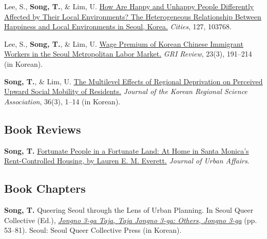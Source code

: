 \documentclass[11pt,letterpaper]{article}
\begin{document}
\begin{tablist}
  \item[2022] \tab{}Lee, S., \textbf{Song, T.}, \& Lim, U. \href{https://doi.org/10.1016/j.cities.2022.103768}{How Are Happy and Unhappy People Differently Affected by Their Local Environments? The Heterogeneous Relationship Between Happiness and Local Environments in Seoul, Korea.} \emph{Cities}, 127, 103768.
  \item[2021] \tab{}Lee, S., \textbf{Song, T.}, \& Lim, U. \href{https://www.dbpia.co.kr/Journal/articleDetail?nodeId=NODE11025769}{Wage Premium of Korean Chinese Immigrant Workers in the Seoul Metropolitan Labor Market.} \emph{GRI Review}, 23(3), 191--214 (in Korean).
  \item[2020] \tab{}\textbf{Song, T.}, \& Lim, U. \href{https://www.koreascience.or.kr/article/JAKO202030161655441.page}{The Multilevel Effects of Regional Deprivation on Perceived Upward Social Mobility of Residents.} \emph{Journal of the Korean Regional Science Association}, 36(3), 1--14 (in Korean).
\end{tablist}

\subsection{Book Reviews}
\begin{tablist}
  \item[2026] \tab{}\textbf{Song, T.} \href{https://doi.org/10.1080/07352166.2026.2707017}{Fortunate People in a Fortunate Land: At Home in Santa Monica's Rent-Controlled Housing, by Lauren E. M. Everett.} \emph{Journal of Urban Affairs}.
\end{tablist}

\subsection{Book Chapters}
\begin{tablist}
  \item[2020] \tab{}\textbf{Song, T.} Queering Seoul through the Lens of Urban Planning. In Seoul Queer Collective (Ed.), \emph{\href{http://www.kyobobook.co.kr/product/detailViewKor.laf?ejkGb=KOR&mallGb=KOR&barcode=9791197096501}{Jongno 3-ga Taja, Taja Jongno 3-ga: Others, Jongno 3-ga}} (pp. 53--81). Seoul: Seoul Queer Collective Press (in Korean).
\end{tablist}
\end{document}
